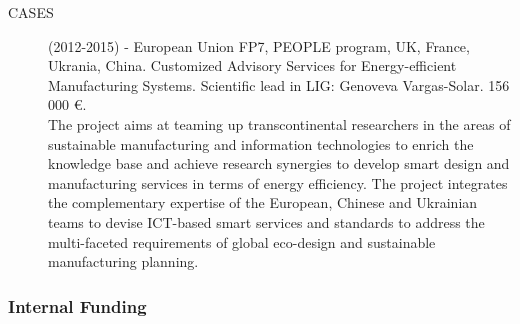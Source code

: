 \begin{description}
\item[CASES] (2012-2015) - European Union FP7, PEOPLE program, UK, France, Ukrania, China. Customized Advisory Services for Energy-efficient Manufacturing Systems. Scientific lead in LIG: Genoveva Vargas-Solar.  156 000 \euro.\\
The project aims at teaming up transcontinental researchers in the areas of sustainable manufacturing and information technologies to enrich the knowledge base and achieve research synergies to develop smart design and manufacturing services in terms of energy efficiency. The project  integrates the complementary expertise of the European, Chinese and Ukrainian teams to devise ICT-based smart services and standards to address the multi-faceted requirements of global eco-design and sustainable manufacturing planning.

\end{description}

\subsubsection{Internal Funding}

